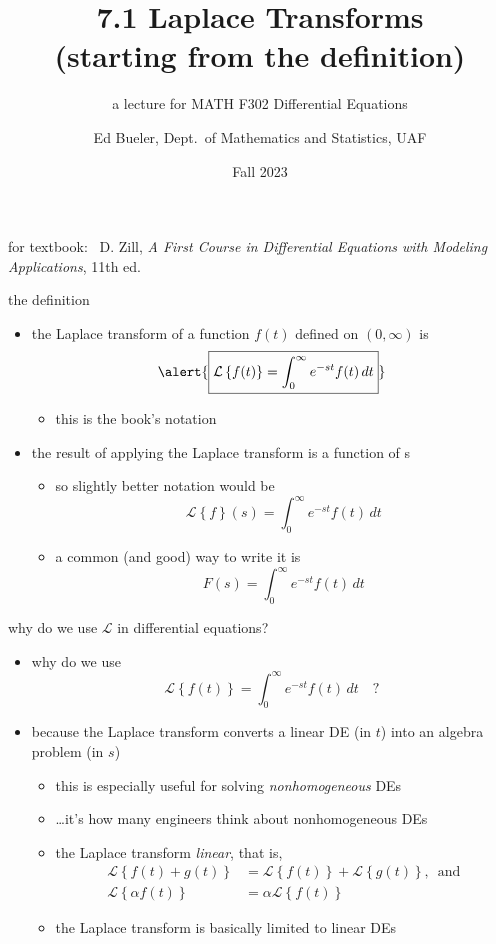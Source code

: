 \documentclass[dvipsnames,colorlinks]{beamer}
\title{7.1 Laplace Transforms \\ (starting from the definition)}
\subtitle{a lecture for MATH F302 Differential Equations}
\author{Ed Bueler, Dept.~of Mathematics and Statistics, UAF}
\date{Fall 2023}
\begin{document}


\begin{frame}
\titlepage

\centerline{\tiny for textbook: \, D. Zill, \emph{A First Course in Differential Equations with Modeling Applications}, 11th ed.}
\end{frame}


\newcommand{\LL}[1]{\mathcal{L}\left\{#1\right\}}

\begin{frame}{the definition}

\begin{itemize}
\item the \alert{Laplace transform} of a function $f(t)$ defined on $(0,\infty)$ is
    $$\alert{\boxed{\LL{f(t)} = \int_0^\infty e^{-st} f(t)\,dt}}$$

\vspace{-2mm}
    \begin{itemize}
    \item this is the book's notation
    \end{itemize}
\item the \alert{result} of applying the Laplace transform \alert{is a function of s}
    \begin{itemize}
    \item  so slightly better notation would be
    $$\LL{f}(s) = \int_0^\infty e^{-st} f(t)\,dt$$
    \item a common (and good) way to write it is
    $$F(s) = \int_0^\infty e^{-st} f(t)\,dt$$
    \end{itemize}
\end{itemize}
\end{frame}


\begin{frame}{why do we use $\mathcal{L}$ in differential equations?}

\begin{itemize}
\item why do we use
    $$\LL{f(t)} = \int_0^\infty e^{-st} f(t)\,dt \quad?$$
\item because the Laplace transform \alert{converts a linear DE} (in $t$) \alert{into an algebra problem} (in $s$)
    \begin{itemize}
    \item this is especially useful for solving \emph{nonhomogeneous} DEs
    \item \dots it's how many engineers think about nonhomogeneous DEs
    \item the Laplace transform \emph{linear}, that is,
\begin{align*}
\LL{f(t) + g(t)} &= \LL{f(t)} + \LL{g(t)}, \, \text{ and} \\
\LL{\alpha f(t)} &= \alpha \LL{f(t)}
\end{align*}
    \item the Laplace transform is basically limited to linear DEs
    \end{itemize}
\end{itemize}
\end{frame}
\end{document}
